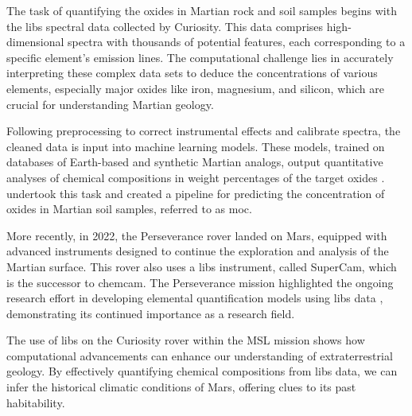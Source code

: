 The task of quantifying the oxides in Martian rock and soil samples begins with the \gls{libs} spectral data collected by Curiosity.
This data comprises high-dimensional spectra with thousands of potential features, each corresponding to a specific element's emission lines.
The computational challenge lies in accurately interpreting these complex data sets to deduce the concentrations of various elements, especially major oxides like iron, magnesium, and silicon, which are crucial for understanding Martian geology.

Following preprocessing to correct instrumental effects and calibrate spectra, the cleaned data is input into machine learning models.
These models, trained on databases of Earth-based and synthetic Martian analogs, output quantitative analyses of chemical compositions in weight percentages of the target oxides \cite{wiensPreflightCalibrationInitial2013, cleggRecalibrationMarsScience2017}.
\citet{cleggRecalibrationMarsScience2017} undertook this task and created a pipeline for predicting the concentration of oxides in Martian soil samples, referred to as \gls{moc}.

More recently, in 2022, the Perseverance rover landed on Mars, equipped with advanced instruments designed to continue the exploration and analysis of the Martian surface.
This rover also uses a \gls{libs} instrument, called SuperCam, which is the successor to \gls{chemcam}.
The Perseverance mission highlighted the ongoing research effort in developing elemental quantification models using \gls{libs} data \cite{andersonPostlandingMajorElement2022}, demonstrating its continued importance as a research field.

The use of \gls{libs} on the Curiosity rover within the MSL mission shows how computational advancements can enhance our understanding of extraterrestrial geology.
By effectively quantifying chemical compositions from \gls{libs} data, we can infer the historical climatic conditions of Mars, offering clues to its past habitability.